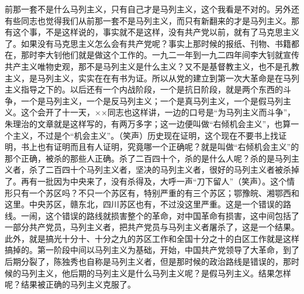 前那一套不是什么马列主义，只有自己才是马列主义，这个我看是不对的。另外还有些同志也觉得我们从前那一套不是马列主义，而只有新翻来的才是马列主义。那有这个事，不是这样说的，事实就不是这样，没有共产党以前，就有了马克思主义了。如果没有马克思主义怎么会有共产党呢？事实上那时候的报纸、刊物、书籍都在，那时李大钊他们就是做这个工作的。一九二一年到一九二四年间李大钊就宣传共产主义唯物史观，那不是马列主义是什么主义？又不是基督教主义，也不是孔教主义，是马列主义，实实在在有书为证。所以从党的建立到第一次大革命是在马列主义指导之下的。以后还有一个内战阶段，一个是抗日阶段，就是两个东西的斗争，一个是马列主义，一个是反马列主义；一个是真马列主义，一个是假马列主义。这个会开了十一天，××同志也这样讲，一边的口号是“为马列主义而斗争”，朱理治的文章就是这样写的，有两万多字；这一边便叫做“右倾机会主义”，也算一个主义，不过是个“机会主义”。（笑声）历史现在证明，这个现在不要书上找证明，书上也有证明而且有人证明，究竟哪一个正确呢？就是叫做“右倾机会主义”的那个正确，被杀的那些人正确。杀了二百四十个，杀的是什么人呢？杀的是马列主义者，杀了二百四十个马列主义者，坚决的马列主义者，很好的马列主义者被杀掉了。再有一批因为中央来了，没有杀得及，大呼一声“刀下留人”（笑声）。这个情形只有一个苏区吗？不只一个苏区有，特别严重的有三个苏区；鄂豫皖、湘鄂西和这里。中央苏区，赣东北，四川苏区也有，不过没这里严重。这是一个错误的路线。一闹，这个错误的路线就损害整个的革命，对中国革命有损害，这中间包括了一部分共产党员，马列主义者，把共产党员与马列主义者屠杀了，这是一个结果。此外，就是搞光十分十、十分之九的苏区工作和全国十分之十的白区工作就是这样搞掉的。第一阶段中间以马列主义为基础，开始，中国共产党领导了大革命，到了后期分裂了，陈独秀也自称是马列主义者，但是那时候的政治路线是错误的，那时候的马列主义，他后期的马列主义是什么马列主义呢？是假马列主义。结果怎样呢？结果被正确的马列主义克服了。


